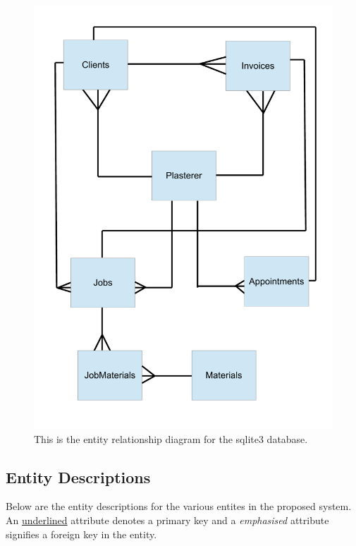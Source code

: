 \begin{figure}[H]
    \includegraphics[width=\textwidth]{./Analysis/images/ER-Diagram.pdf}
    \caption{This is the entity relationship diagram for the sqlite3 database.} \label{fig:Entity_Relationship_Diagram}
\end{figure}


\subsection{Entity Descriptions}

\begin{flushleft}

Below are the entity descriptions for the various entites in the proposed system. An \underline{underlined} attribute denotes a primary key and a \emph{emphasised}	attribute signifies a foreign key in the entity.

\end{flushleft}




